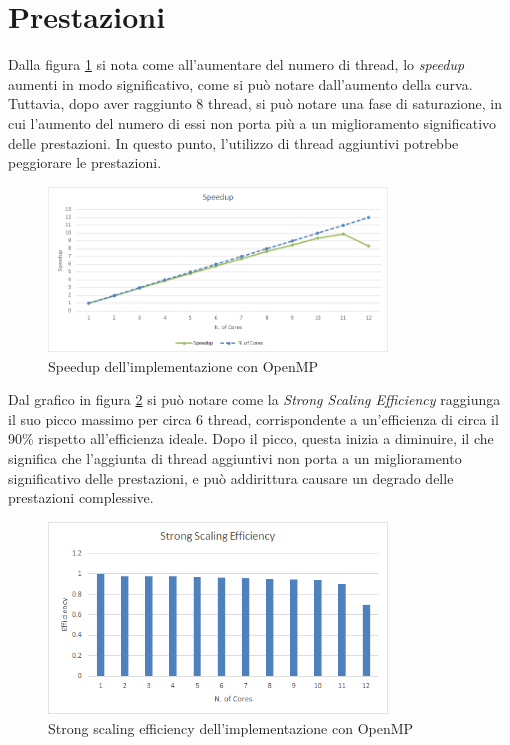 \documentclass[a4paper, 12pt]{report}
\begin{document}
\section*{Prestazioni}
\begin{sloppypar}
  \noindent
  Dalla figura \ref{fig:omp_speedup} si nota come all'aumentare del numero di thread, lo \textit{speedup} aumenti in modo significativo,
  come si può notare dall'aumento della curva. Tuttavia, dopo aver raggiunto 8 thread, si può notare una fase di 
  saturazione, in cui l'aumento del numero di essi non porta più 
  a un miglioramento significativo delle prestazioni. In questo punto, l'utilizzo di thread aggiuntivi potrebbe 
  peggiorare le prestazioni. 

  \begin{figure}[ht]
    \centering
    \includegraphics[width=9cm]{img/omp-speedup.png}
    \caption{Speedup dell'implementazione con OpenMP}
    \label{fig:omp_speedup}
  \end{figure}

  \noindent
  Dal grafico in figura \ref{fig:omp_sse} si può notare come la \textit{Strong Scaling Efficiency} raggiunga
  il suo picco massimo per circa 6 thread, corrispondente a un'efficienza di circa il 90\% rispetto 
  all'efficienza ideale. Dopo il picco, questa inizia a diminuire, il che significa 
  che l'aggiunta di thread aggiuntivi non porta a un miglioramento significativo delle prestazioni, 
  e può addirittura causare un degrado delle prestazioni complessive.

  \begin{figure}[ht]
    \centering
    \includegraphics[width=9cm]{img/omp-sse.png}
    \caption{Strong scaling efficiency dell'implementazione con OpenMP}
    \label{fig:omp_sse}
  \end{figure}


\end{sloppypar}
\end{document}

